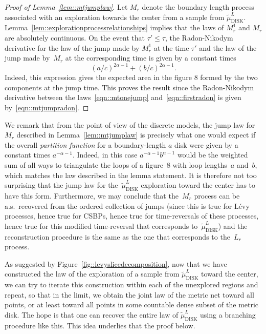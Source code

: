 \documentclass[10pt]{amsart}
\theoremstyle{plain}
\numberwithin{theorem}{section}
\theoremstyle{definition}
\newcommand{\tmudl}{\wt{\mu}_{\mathrm{DISK}}^L}
\let\wt\widetilde
\begin{document}
\begin{proof}[Proof of Lemma~\ref{lem::mtjumplaw}]
Let $M_r$ denote the boundary length process associated with an exploration towards the center from a sample from $\tmudl$. Lemma~\ref{lem::explorationprocessrelationships} implies that the laws of $M_r^1$ and $M_r$ are absolutely continuous. On the event that $\tau' \leq \tau$, the Radon-Nikodym derivative for the law of the jump made by $M_r^1$ at the time $\tau'$ and the law of the jump made by~$M_r$ at the corresponding time is given by a constant times
\begin{equation}
\label{eqn::mtjumpradon}
(a/c)^{2\alpha-1} + (b/c)^{2\alpha - 1}.
\end{equation}
Indeed, this expression gives the expected area in the figure $8$ formed by the two components at the jump time. This proves the result since the Radon-Nikodym derivative between the laws~\eqref{eqn::mtonejump} and~\eqref{eqn::firstradon} is given by~\eqref{eqn::mtjumpradon}.
\end{proof}

We remark that from the point of view of the discrete models, the jump law for~$M_r$ described in Lemma~\ref{lem::mtjumplaw} is precisely what one would expect if the overall \emph{partition function} for a boundary-length $a$ disk were given by a constant times $a^{-\alpha -1}$. Indeed, in this case $a^{-\alpha - 1} b^{\alpha -1}$ would be the weighted sum of all ways to triangulate the loops of a figure~$8$ with loop lengths~$a$ and~$b$, which matches the law described in the lemma statement. It is therefore not too surprising that the jump law for the~$\tmudl$ exploration toward the center has to have this form. Furthermore, we may conclude that the~$M_r$ process can be a.s.\ recovered from the ordered collection of jumps (since this is true for Lévy processes, hence true for CSBPs, hence true for time-reversals of these processes, hence true for this modified time-reversal that corresponds to~$\tmudl$) and the reconstruction procedure is the same as the one that corresponds to the~$L_r$ process.

As suggested by Figure~\ref{fig::levyslicedecomposition}, now that we have constructed the law of the exploration of a sample from $\tmudl$ toward the center, we can try to iterate this construction within each of the unexplored regions and repeat, so that in the limit, we obtain the joint law of the metric net toward all points, or at least toward all points in some countable dense subset of the metric disk. The hope is that one can recover the entire law of $\tmudl$ using a branching procedure like this. This idea underlies that the proof below.
\end{document}

